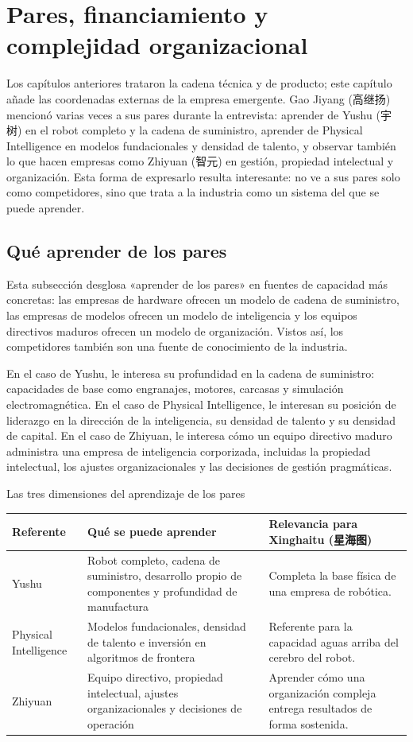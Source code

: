 \section{Pares, financiamiento y complejidad organizacional}

Los capítulos anteriores trataron la cadena técnica y de producto; este capítulo añade las coordenadas externas de la empresa emergente. Gao Jiyang (高继扬) mencionó varias veces a sus pares durante la entrevista: aprender de Yushu (宇树) en el robot completo y la cadena de suministro, aprender de Physical Intelligence en modelos fundacionales y densidad de talento, y observar también lo que hacen empresas como Zhiyuan (智元) en gestión, propiedad intelectual y organización. Esta forma de expresarlo resulta interesante: no ve a sus pares solo como competidores, sino que trata a la industria como un sistema del que se puede aprender.

\subsection{Qué aprender de los pares}

Esta subsección desglosa «aprender de los pares» en fuentes de capacidad más concretas: las empresas de hardware ofrecen un modelo de cadena de suministro, las empresas de modelos ofrecen un modelo de inteligencia y los equipos directivos maduros ofrecen un modelo de organización. Vistos así, los competidores también son una fuente de conocimiento de la industria.

En el caso de Yushu, le interesa su profundidad en la cadena de suministro: capacidades de base como engranajes, motores, carcasas y simulación electromagnética. En el caso de Physical Intelligence, le interesan su posición de liderazgo en la dirección de la inteligencia, su densidad de talento y su densidad de capital. En el caso de Zhiyuan, le interesa cómo un equipo directivo maduro administra una empresa de inteligencia corporizada, incluidas la propiedad intelectual, los ajustes organizacionales y las decisiones de gestión pragmáticas.

\begin{knowledgebox}{Las tres dimensiones del aprendizaje de los pares}
\begin{tabularx}{\textwidth}{p{}p{}X}
\toprule
Referente & Qué se puede aprender & Relevancia para Xinghaitu (星海图) \\
\midrule
Yushu & Robot completo, cadena de suministro, desarrollo propio de componentes y profundidad de manufactura & Completa la base física de una empresa de robótica. \\
Physical Intelligence & Modelos fundacionales, densidad de talento e inversión en algoritmos de frontera & Referente para la capacidad aguas arriba del cerebro del robot. \\
Zhiyuan & Equipo directivo, propiedad intelectual, ajustes organizacionales y decisiones de operación & Aprender cómo una organización compleja entrega resultados de forma sostenida. \\
\bottomrule
\end{tabularx}
\end{knowledgebox}

